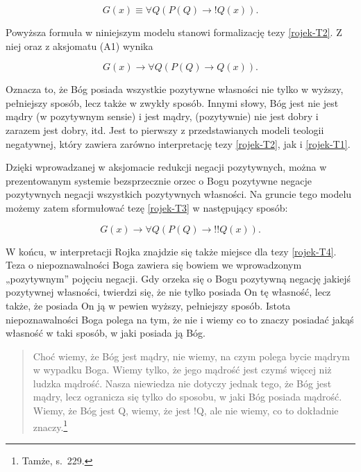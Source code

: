 \begin{equation}\label{G5}\tag{G5}
 G(x) \equiv  \forall Q (P(Q) \to  !Q(x)).
\end{equation}



Powyższa formuła w niniejszym modelu stanowi formalizację tezy \eqref{rojek-T2}. Z
niej oraz z aksjomatu (A1) wynika




\begin{equation}
G(x) \to  \forall Q (P(Q) \to  Q(x)).
\end{equation}




Oznacza to, że Bóg posiada wszystkie pozytywne własności nie tylko w
wyższy, pełniejszy sposób, lecz także w zwykły sposób. Innymi słowy,
Bóg jest nie jest mądry (w pozytywnym sensie) i jest mądry,
(pozytywnie) nie jest dobry i zarazem jest dobry, itd. Jest to pierwszy
z przedstawianych modeli teologii negatywnej, który zawiera zarówno
interpretację tezy \eqref{rojek-T2}, jak i \eqref{rojek-T1}.

Dzięki wprowadzanej w aksjomacie redukcji negacji pozytywnych, można w
prezentowanym systemie bezsprzecznie orzec o Bogu pozytywne negacje
pozytywnych negacji wszystkich pozytywnych własności. Na gruncie tego
modelu możemy zatem sformułować tezę \eqref{rojek-T3} w następujący sposób:




\begin{equation}
G(x) \to  \forall Q (P(Q) \to  !!Q(x)).
\end{equation}




W końcu, w interpretacji Rojka znajdzie się także miejsce dla tezy \eqref{rojek-T4}.
Teza o niepoznawalności Boga zawiera się bowiem we wprowadzonym
„pozytywnym” pojęciu negacji. Gdy orzeka się o Bogu pozytywną negację
jakiejś pozytywnej własności, twierdzi się, że nie tylko posiada On tę
własność, lecz także, że posiada On ją w pewien wyższy, pełniejszy
sposób. Istota niepoznawalności Boga polega na tym, że nie i wiemy co
to znaczy posiadać jakąś własność w taki sposób, w jaki posiada ją Bóg.



\begin{quote}
    Choć wiemy, że Bóg jest mądry, nie wiemy, na czym polega bycie mądrym w
wypadku Boga. Wiemy tylko, że jego mądrość jest czymś więcej niż ludzka
mądrość. Nasza niewiedza nie dotyczy jednak tego, że Bóg jest mądry,
lecz ogranicza się tylko do sposobu, w jaki Bóg posiada mądrość. Wiemy,
że Bóg jest Q, wiemy, że jest !Q, ale nie wiemy, co to dokładnie
znaczy.\footnote{Tamże, s.~229. }
\end{quote}





